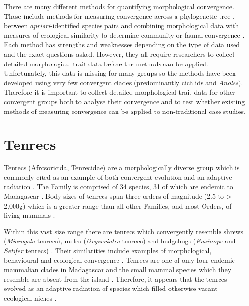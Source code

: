 	There are many different methods for quantifying morphological convergence. These include methods for measuring convergence across a phylogenetic tree \citep{Stayton2008}, between \textit{apriori}-identified species pairs \citep{Arbuckle2014, Muschick2012, Stayton2006} and combining morphological data with measures of ecological similarity to determine community or faunal convergence \citep{Ingram2013, Mahler2013, Moen2013, Melville2006}. Each method has strengths and weaknesses depending on the type of data used and the exact questions asked. However, they all require researchers to collect detailed morphological trait data before the methods can be applied. Unfortunately, this data is missing for many groups so the methods have been developed using very few convergent clades (predominantly cichlids and \textit{Anoles}). Therefore it is important to collect detailed morphological trait data for other convergent groups both to analyse their convergence and to test whether existing methods of measuring convergence can be applied to non-traditional case studies.
\section{Tenrecs}
	Tenrecs (Afrosoricida, Tenrecidae) are a morphologically diverse group which is commonly cited as an example of both convergent evolution and an adaptive radiation \citep{Soarimalala2011, Eisenberg1969}. The Family is comprised of 34 species, 31 of which are endemic to Madagascar \citep{Olson2013}. Body sizes of tenrecs span three orders of magnitude (2.5 to > 2,000g) which is a greater range than all other Families, and most Orders, of living mammals \citep{Olson2003}.
	
	Within this vast size range there are tenrecs which convergently resemble shrews (\textit{Microgale} tenrecs), moles (\textit{Oryzorictes} tenrecs) and hedgehogs (\textit{Echinops} and \textit{Setifer} tenrecs) \citep{Eisenberg1969}. Their similarities include examples of morphological, behavioural and ecological convergence \citep{Soarimalala2011}. Tenrecs are one of only four endemic mammalian clades in Madagascar and the small mammal species which they resemble are absent from the island \citep{Garbutt1999}. Therefore, it appears that the tenrecs evolved as an adaptive radiation of species which filled otherwise vacant ecological niches \citep{Soarimalala2011}.

